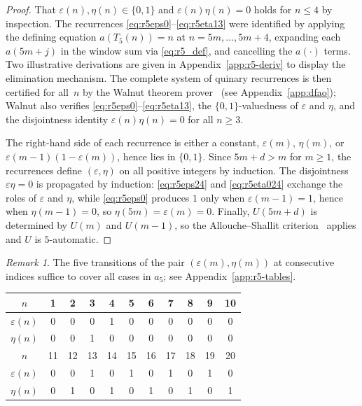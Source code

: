 \documentclass[12pt]{article}
\theoremstyle{definition}
\theoremstyle{remark}
\newtheorem{remark}[theorem]{Remark}
\begin{document}
\begin{proof}
That $\varepsilon(n),\eta(n)\in\{0,1\}$ and $\varepsilon(n)\eta(n)=0$ holds for
$n\le 4$ by inspection.
The recurrences \eqref{eq:r5eps0}--\eqref{eq:r5eta13} were identified by applying
the defining equation $a(T_5(n))=n$ at $n=5m,\ldots,5m+4$, expanding each
$a(5m+j)$ in the window sum via \eqref{eq:r5_def}, and cancelling the $a(\cdot)$
terms. Two illustrative derivations are given in Appendix~\ref{app:r5-deriv}
to display the elimination mechanism.
The complete system of quinary recurrences
is then certified for all~$n$ by the Walnut theorem prover~\cite{Shallit2022}
(see Appendix~\ref{app:dfao}); Walnut also
verifies \eqref{eq:r5eps0}--\eqref{eq:r5eta13}, the $\{0,1\}$-valuedness
of $\varepsilon$ and $\eta$, and the disjointness identity
$\varepsilon(n)\eta(n)=0$ for all $n\ge 3$.

The right-hand side of each recurrence is either a constant, $\varepsilon(m)$,
$\eta(m)$, or $\varepsilon(m-1)(1-\varepsilon(m))$, hence lies in $\{0,1\}$.
Since $5m+d>m$ for $m\ge 1$, the recurrences define $(\varepsilon,\eta)$ on all
positive integers by induction. The disjointness $\varepsilon\eta=0$ is propagated
by induction: \eqref{eq:r5eps24} and \eqref{eq:r5eta024} exchange the roles of
$\varepsilon$ and $\eta$, while \eqref{eq:r5eps0} produces $1$ only when
$\varepsilon(m-1)=1$, hence when $\eta(m-1)=0$, so $\eta(5m)=\varepsilon(m)=0$.
Finally, $U(5m+d)$ is determined by $U(m)$ and $U(m-1)$, so the Allouche--Shallit
criterion~\cite{AS12} applies and $U$ is $5$-automatic.
\end{proof}

\begin{remark}
The five transitions of the pair $(\varepsilon(m),\eta(m))$ at consecutive
indices suffice to cover all cases in $a_5$; see Appendix~\ref{app:r5-tables}.
\end{remark}


\medskip
\begin{center}
\renewcommand{\arraystretch}{1.3}
\begin{tabular}{c|cccccccccc}
$n$ & 1 & 2 & 3 & 4 & 5 & 6 & 7 & 8 & 9 & 10 \\\hline
$\varepsilon(n)$ & 0 & 0 & 0 & 1 & 0 & 0 & 0 & 0 & 0 & 0 \\
$\eta(n)$ & 0 & 0 & 1 & 0 & 0 & 0 & 0 & 0 & 0 & 0 \\
\hline
$n$ & 11 & 12 & 13 & 14 & 15 & 16 & 17 & 18 & 19 & 20 \\\hline
$\varepsilon(n)$ & 0 & 0 & 1 & 0 & 1 & 0 & 1 & 0 & 1 & 0 \\
$\eta(n)$ & 0 & 1 & 0 & 1 & 0 & 1 & 0 & 1 & 0 & 1 \\
\end{tabular}
\end{center}
\medskip
\end{document}

